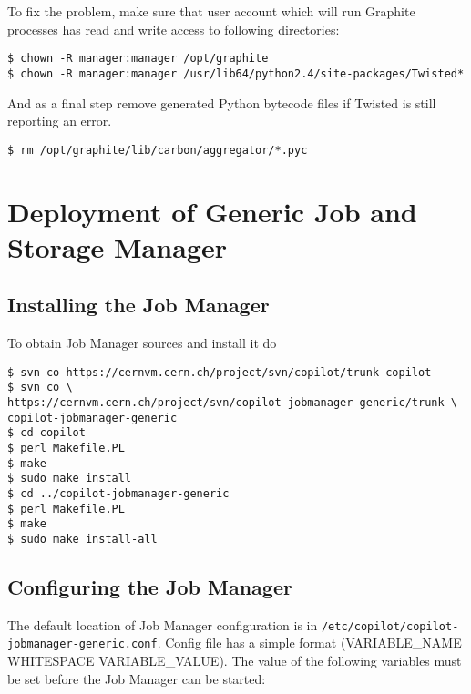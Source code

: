 To fix the problem, make sure that user account which will run Graphite processes has read and write access to following directories:
\lstset{caption=Adjusting directory permissions}
\begin{lstlisting}
$ chown -R manager:manager /opt/graphite
$ chown -R manager:manager /usr/lib64/python2.4/site-packages/Twisted*
\end{lstlisting}

And as a final step remove generated Python bytecode files if Twisted is still reporting an error.
\lstset{caption=Removing Python bytecode files}
\begin{lstlisting}
$ rm /opt/graphite/lib/carbon/aggregator/*.pyc
\end{lstlisting}

\section{Deployment of \copilot Generic Job and Storage Manager}
\subsection{Installing the Job Manager}
To obtain Job Manager sources and install it do

\lstset{caption=\copilot Generic Job Manager installation}
\begin{lstlisting}
$ svn co https://cernvm.cern.ch/project/svn/copilot/trunk copilot
$ svn co \
https://cernvm.cern.ch/project/svn/copilot-jobmanager-generic/trunk \
copilot-jobmanager-generic
$ cd copilot
$ perl Makefile.PL
$ make
$ sudo make install
$ cd ../copilot-jobmanager-generic
$ perl Makefile.PL
$ make
$ sudo make install-all
\end{lstlisting}

\subsection{Configuring the Job Manager}
\label{sct:jmconfig}

The default location of Job Manager configuration is in \texttt{/etc/copilot/copilot-jobmanager-generic.conf}. Config file has a simple format (VARIABLE\_NAME WHITESPACE VARIABLE\_VALUE).
The value of the following variables must be set before the Job Manager can be started:

